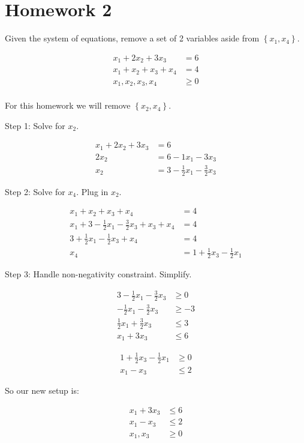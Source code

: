 \section*{Homework 2}

Given the system of equations, remove a set of 2 variables aside from $\left\{ x_1, x_4 \right\}$.

\begin{align*}
	x_1 + 2x_2 + 3x_3 &= 6 \\
	x_1 + x_2 + x_3 + x_4 &= 4 \\
	x_1, x_2, x_3, x_4 &\geq 0 \\
\end{align*}

For this homework we will remove $\left\{ x_2, x_4 \right\}$.

Step 1: Solve for $x_2$.

\begin{align*}
	x_1 + 2x_2 + 3x_3 &= 6 \\
	2x_2 &= 6 - 1x_1 - 3x_3 \\
	x_2 &= 3 - \frac{1}{2}x_1 - \frac{3}{2}x_3 
\end{align*}

Step 2: Solve for $x_4$. Plug in $x_2$.

\begin{align*}
	x_1 + x_2 + x_3 + x_4 &= 4 \\
	x_1 + 3 - \frac{1}{2}x_1 - \frac{3}{2}x_3 + x_3 + x_4 &= 4 \\
	3 + \frac{1}{2}x_1 - \frac{1}{2}x_3 + x_4 &= 4 \\
	x_4 &= 1 + \frac{1}{2}x_3 - \frac{1}{2}x_1
\end{align*}

Step 3: Handle non-negativity constraint. Simplify.

\begin{align*}
	3 - \frac{1}{2}x_1 - \frac{3}{2}x_3 &\geq 0 \\
	- \frac{1}{2}x_1 - \frac{3}{2}x_3 &\geq -3 \\
	\frac{1}{2}x_1 + \frac{3}{2}x_3 &\leq 3 \\
	x_1 + 3x_3 &\leq 6
\end{align*}

\begin{align*}
	1 + \frac{1}{2}x_3 - \frac{1}{2}x_1 &\geq 0 \\
	x_1 - x_3 &\leq 2
\end{align*}

So our new setup is:

\begin{align*}
	x_1 + 3x_3 &\leq 6 \\
	x_1 - x_3 &\leq 2 \\
	x_1, x_3 &\geq 0
\end{align*}

